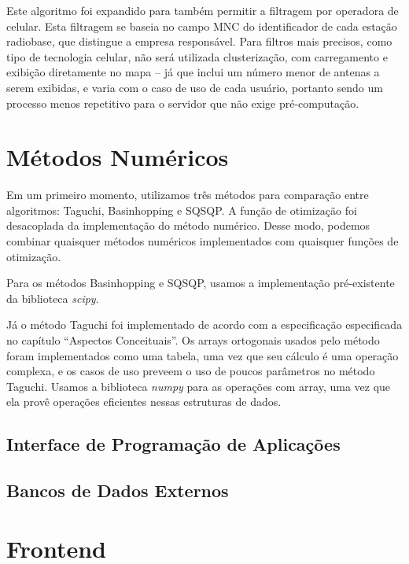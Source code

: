 \documentclass[]{politex}
\begin{document}
Este algoritmo foi expandido para também permitir a filtragem por operadora de
celular. Esta filtragem se baseia no campo MNC do identificador de cada estação
radiobase, que distingue a empresa responsável. Para filtros mais precisos, como
tipo de tecnologia celular, não será utilizada clusterização, com carregamento e
exibição diretamente no mapa -- já que inclui um número menor de antenas a serem
exibidas, e varia com o caso de uso de cada usuário, portanto sendo um processo
menos repetitivo para o servidor que não exige pré-computação.

\section{Métodos Numéricos}

Em um primeiro momento, utilizamos três métodos para comparação entre
algoritmos: Taguchi, Basinhopping e SQSQP. A função de otimização foi
desacoplada da implementação do método numérico. Desse modo, podemos combinar
quaisquer métodos numéricos implementados com quaisquer funções de otimização.

Para os métodos Basinhopping e SQSQP, usamos a implementação pré-existente da
biblioteca \textit{scipy}.

Já o método Taguchi foi implementado de acordo com a especificação especificada
no capítulo ``Aspectos Conceituais''. Os arrays ortogonais usados pelo método
foram implementados como uma tabela, uma vez que seu cálculo é uma operação
complexa, e os casos de uso preveem o uso de poucos parâmetros no método
Taguchi. Usamos a biblioteca \textit{numpy} para as operações com array, uma vez
que ela provê operações eficientes nessas estruturas de dados.


\subsection{Interface de Programação de Aplicações}


\subsection{Bancos de Dados Externos}


\section{Frontend}
\end{document}
